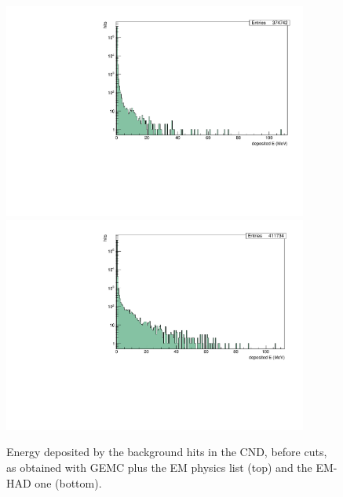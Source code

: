 \begin{figure}  
\begin{center}
\includegraphics[width=100mm]{Egen_beforecuts_EMonly.pdf}
\includegraphics[width=100mm]{Egen_beforecuts_EMhad.pdf}
\caption []
{Energy deposited by the background hits in the CND, before cuts, as obtained with GEMC plus the EM physics list (top) and the EM-HAD one (bottom).}
\label{edep_background}
\end{center}
\end{figure}

